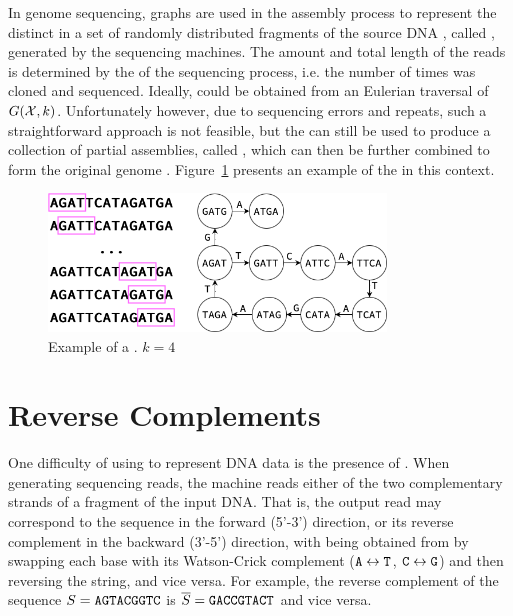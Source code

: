 In genome sequencing, \dB graphs are used in the assembly process to represent the distinct  in a set \readset of randomly distributed fragments of the source DNA , called , generated by the sequencing machines. The amount and total length of the reads is determined by the  of the sequencing process, i.e. the number of times  was cloned and sequenced. Ideally,  could be obtained from an Eulerian traversal of $G(\readset, k)$. Unfortunately however, due to sequencing errors and repeats, such a straightforward approach is not feasible, but the \dBG can still be used to produce a collection of partial assemblies, called , which can then be further combined to form the original genome \cite{Pevzner2001}. Figure~\ref{fig:dbgexample} presents an example of the \dBG in this context.

\begin{figure}[htbp]
	\begin{center}
    \includegraphics[width=0.8\textwidth]{figures/dbg-example}
	\end{center}
	\caption{Example of a \dBG. $k=4$}\label{fig:dbgexample}
\end{figure}

\section{Reverse Complements}
\label{subsec:dBG-reversecomplements}

One difficulty of using  to represent DNA data is the presence of . When generating sequencing reads, the machine reads either of the two complementary strands of a fragment of the input DNA. That is, the output read may correspond to the sequence  in the forward (5'-3') direction, or its reverse complement  in the backward (3'-5') direction, with
 being obtained from  by swapping each base with its Watson-Crick complement
($\mathtt{A} \leftrightarrow \mathtt{T}$, $\mathtt{C} \leftrightarrow \mathtt{G}$) and then reversing the string, and vice versa. For example, the reverse complement of the sequence $S=\mathtt{AGTACGGTC}$ is $\overline{S}=\mathtt{GACCGTACT}$ and vice versa.

